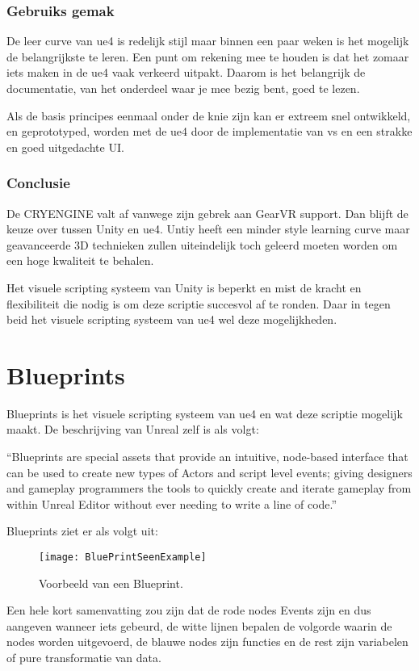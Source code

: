 \subsubsection{Gebruiks gemak}
De leer curve van \gls{ue4} is redelijk stijl maar binnen een paar weken is het mogelijk de belangrijkste te leren. Een punt om rekening mee te houden is dat het zomaar iets maken in de \gls{ue4} vaak verkeerd uitpakt. Daarom is het belangrijk de documentatie, van het onderdeel waar je mee bezig bent, goed te lezen.

Als de basis principes eenmaal onder de knie zijn kan er extreem snel ontwikkeld, en geprototyped, worden met de \gls{ue4} door de implementatie van \gls{vs} en een strakke en goed uitgedachte UI.

\subsubsection{Conclusie}
De CRYENGINE valt af vanwege zijn gebrek aan GearVR support. Dan blijft de keuze over tussen Unity en \gls{ue4}. Untiy heeft een minder style learning curve maar geavanceerde 3D technieken zullen uiteindelijk toch geleerd moeten worden om een hoge kwaliteit te behalen. 

Het visuele scripting systeem van Unity is beperkt en mist de kracht en flexibiliteit die nodig is om deze scriptie succesvol af te ronden. Daar in tegen beid het visuele scripting systeem van \gls{ue4} wel deze mogelijkheden.

\section{Blueprints}
Blueprints is het visuele scripting systeem van \gls{ue4} en wat deze scriptie mogelijk maakt. De beschrijving van Unreal zelf is als volgt:

“Blueprints are special assets that provide an intuitive, node-based interface that can be used to create new types of Actors and script level events; giving designers and gameplay programmers the tools to quickly create and iterate gameplay from within Unreal Editor without ever needing to write a line of code.”

Blueprints ziet er als volgt uit:

\begin{figure}[!ht]
  \centering
    \texttt{[image: BluePrintSeenExample]}
    \caption{Voorbeeld van een Blueprint.}
\end{figure}

Een hele kort samenvatting zou zijn dat de rode nodes Events zijn en dus aangeven wanneer iets gebeurd, de witte lijnen bepalen de volgorde waarin de nodes worden uitgevoerd, de blauwe nodes zijn functies en de rest zijn variabelen of pure transformatie van data.